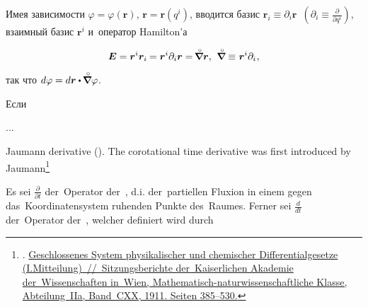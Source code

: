 \begin{otherlanguage}{russian}

Имея зависимости ${\varphi \!=\! \varphi(\bm{r})}$, ${\bm{r} \!=\! \bm{r}(q^{i})}$, вводится базис ${\bm{r}_i \equiv \partial_i \bm{r}}$~${(\partial_i \equiv \frac{\partial}{\partial q^i})}$, взаимный базис ${\bm{r}^i}$ и~оператор Hamilton’а

\nopagebreak\vspace{-0.4em}\begin{equation}
\bm{E} = \bm{r}^i \bm{r}_i \hspace{-0.1ex} = \bm{r}^i \partial_i \bm{r} = \hspace{-0.25ex} \boldnablacircled \bm{r} , \:\,
\boldnablacircled \equiv \hspace{.1ex} \bm{r}^i \partial_i \hspace{.1ex} ,
\end{equation}

\vspace{-0.2em}\noindent так что ${d\varphi = d\bm{r} \dotp \hspace{-0.1ex} \boldnablacircled \varphi}$.

Если

...

Jaumann derivative (). The corotational time derivative was first introduced by Jaumann\footnote{%
. \href{http://www.physikdidaktik.uni-karlsruhe.de/download/jaumann_1911.pdf}{Geschlossenes System phy\-si\-ka\-li\-scher und che\-mi\-scher Differential\-gesetze (I.\;Mit\-teilung)~//~Sitzungs\-berichte der~Kaiser\-lichen Akademie der~Wissen\-schaften in~Wien, Mathematisch\hbox{-}naturwissenschaftliche Klasse, Abteilung~IIa, Band~CXX, 1911. Seiten 385\hbox{--}530.}}

\nopagebreak\begin{tcolorbox}[breakable, enhanced, colback = orange!8, before upper={\parindent3.2ex}, parbox = false]
\small%
\setlength{\abovedisplayskip}{2pt}\setlength{\belowdisplayskip}{2pt}%

Es sei ${\frac{\partial}{\partial t}}$ der~Operator der~, d.\:i. der~partiellen Fluxion in einem gegen das~Koordinatensystem ruhenden Punkte des~Raumes. Ferner sei ${\frac{d}{dt}}$ der~Operator der~, welcher definiert wird durch


\end{tcolorbox}
\end{otherlanguage}
